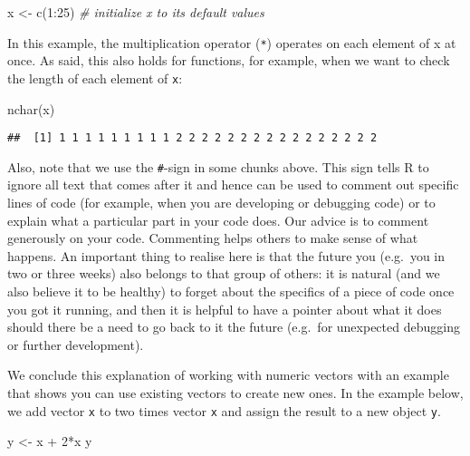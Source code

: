 \documentclass[
]{article}
\newenvironment{Shaded}{\begin{snugshade}}{\end{snugshade}}
\newcommand{\CommentTok}[1]{\textcolor[rgb]{0.56,0.35,0.01}{\textit{#1}}}
\newcommand{\DecValTok}[1]{\textcolor[rgb]{0.00,0.00,0.81}{#1}}
\newcommand{\FunctionTok}[1]{\textcolor[rgb]{0.00,0.00,0.00}{#1}}
\newcommand{\NormalTok}[1]{#1}
\newcommand{\OtherTok}[1]{\textcolor[rgb]{0.56,0.35,0.01}{#1}}
\newcommand{\SpecialCharTok}[1]{\textcolor[rgb]{0.00,0.00,0.00}{#1}}
\begin{document}
\begin{Shaded}
\begin{Highlighting}[]
\NormalTok{x }\OtherTok{\textless{}{-}} \FunctionTok{c}\NormalTok{(}\DecValTok{1}\SpecialCharTok{:}\DecValTok{25}\NormalTok{) }\CommentTok{\# initialize x to its default values}
\end{Highlighting}
\end{Shaded}

In this example, the multiplication operator (\texttt{*}) operates on
each element of x at once. As said, this also holds for functions, for
example, when we want to check the length of each element of \texttt{x}:

\begin{Shaded}
\begin{Highlighting}[]
\FunctionTok{nchar}\NormalTok{(x)}
\end{Highlighting}
\end{Shaded}

\begin{verbatim}
##  [1] 1 1 1 1 1 1 1 1 1 2 2 2 2 2 2 2 2 2 2 2 2 2 2 2 2
\end{verbatim}

Also, note that we use the \texttt{\#}-sign in some chunks above. This
sign tells R to ignore all text that comes after it and hence can be
used to comment out specific lines of code (for example, when you are
developing or debugging code) or to explain what a particular part in
your code does. Our advice is to comment generously on your code.
Commenting helps others to make sense of what happens. An important
thing to realise here is that the future you (e.g.~you in two or three
weeks) also belongs to that group of others: it is natural (and we also
believe it to be healthy) to forget about the specifics of a piece of
code once you got it running, and then it is helpful to have a pointer
about what it does should there be a need to go back to it the future
(e.g.~for unexpected debugging or further development).

We conclude this explanation of working with numeric vectors with an
example that shows you can use existing vectors to create new ones. In
the example below, we add vector \texttt{x} to two times vector
\texttt{x} and assign the result to a new object \texttt{y}.

\begin{Shaded}
\begin{Highlighting}[]
\NormalTok{y }\OtherTok{\textless{}{-}}\NormalTok{ x }\SpecialCharTok{+} \DecValTok{2}\SpecialCharTok{*}\NormalTok{x}
\NormalTok{y}
\end{Highlighting}
\end{Shaded}
\end{document}
